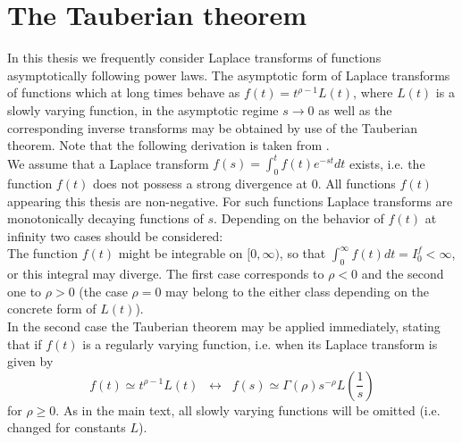 \chapter{The Tauberian theorem} \label{sec:tauberian}

In this thesis we frequently consider Laplace transforms of functions asymptotically following power laws. The asymptotic form of Laplace transforms of functions which at long times behave as $f(t) = t^{\rho-1} L(t)$, where $L(t)$ is a slowly varying function, in the asymptotic regime $s \to 0$ as well as the corresponding inverse transforms may be obtained by use of the Tauberian theorem. Note that the following derivation is taken from \cite{bothe}.\\

We assume that a Laplace transform $f(s) = \int_0^t f(t) e^{-st} dt$ exists, i.e. the function $f(t)$ does not possess a strong divergence at 0. All functions $f(t)$ appearing this thesis are non-negative. For such functions Laplace transforms are monotonically decaying functions of $s$. Depending on the behavior of $f(t)$ at infinity two cases should be considered: \\
The function $f(t)$ might be integrable on $[0, \infty)$, so that 
$\int_0^\infty f(t) dt = I_0^{f} < \infty$, or this integral may diverge. The first case corresponds to $\rho < 0$ and 
the second one to $\rho > 0$ (the case $\rho = 0$ may belong to the either class depending on the concrete form of $L(t)$). \\
In the second case the Tauberian theorem may be applied immediately, stating that if $f(t)$ is a regularly varying function, i.e. when  its Laplace transform is given by 
\begin{equation}
 f(t) \simeq t^{\rho-1} L(t) \;\; \leftrightarrow \;\; f(s) \simeq \Gamma(\rho) s^{-\rho} L\left(\frac{1}{s}\right)
 \label{eq:Tauberian}
\end{equation}
for $\rho \geq 0$. As in the main text, all slowly varying functions will be omitted (i.e. changed for constants $L$). 

